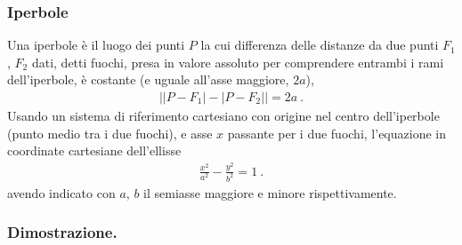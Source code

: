 \documentclass[letterpaper,10pt,italian]{jupyterBook}
\begin{document}
\subsubsection{Iperbole}
\label{\detokenize{ch/analytic_geometry/analytic_geometry_2d/conics-cartesian:iperbole}}
\sphinxAtStartPar
Una iperbole è il luogo dei punti \(P\) la cui differenza delle distanze da due punti \(F_1\), \(F_2\) dati, detti fuochi, presa in valore assoluto per comprendere entrambi i rami dell’iperbole, è costante (e uguale all’asse maggiore, \(2 a\)),
\begin{equation*}
\begin{split}\big| |P - F_1| - |P - F_2| \big| = 2 a \ .\end{split}
\end{equation*}
\sphinxAtStartPar
Usando un sistema di riferimento cartesiano con origine nel centro dell’iperbole (punto medio tra i due fuochi), e asse \(x\) passante per i due fuochi, l’equazione in coordinate cartesiane dell’ellisse
\begin{equation*}
\begin{split}\frac{x^2}{a^2} - \frac{y^2}{b^2} = 1 \ .\end{split}
\end{equation*}
\sphinxAtStartPar
avendo indicato con \(a\), \(b\) il semiasse maggiore e minore rispettivamente.
\subsubsection*{Dimostrazione.}
\end{document}

